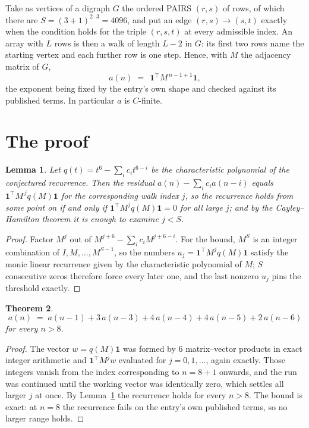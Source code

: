 \documentclass[11pt,a4paper]{article}
\theoremstyle{plain}
\newtheorem{theorem}{Theorem}
\newtheorem{lemma}[theorem]{Lemma}
\theoremstyle{definition}
\begin{document}
Take as vertices of a digraph $G$ the ordered PAIRS $(r,s)$ of rows, of which there are
$S=(3+1)^{2\cdot3}=4096$, and put an edge $(r,s)\to(s,t)$ exactly when the condition
holds for the triple $(r,s,t)$ at every admissible index. An array with $L$ rows is then a
walk of length $L-2$ in $G$: its first two rows name the starting vertex and each further
row is one step. Hence, with $M$ the adjacency matrix of $G$,
\[
a(n)\;=\;\,\mathbf{1}^{\!\top}M^{\,n-1+1}\mathbf{1},
\]
the exponent being fixed by the entry's own shape and checked against its published terms.
In particular $a$ is $C$-finite.

\section{The proof}

\begin{lemma}\label{lem:crit}
Let $q(t)=t^{6}-\sum_i c_it^{6-i}$ be the characteristic polynomial of the
conjectured recurrence. Then the residual $a(n)-\sum_ic_ia(n-i)$ equals
$\mathbf{1}^{\!\top}M^{\,j}q(M)\mathbf{1}$ for the corresponding walk index
$j$, so the recurrence holds from some point on if and only if
$\mathbf{1}^{\!\top}M^{j}q(M)\mathbf{1}=0$ for all large $j$; and by the
Cayley--Hamilton theorem it is enough to examine $j<S$.
\end{lemma}

\begin{proof}
Factor $M^{j}$ out of $M^{j+6}-\sum_ic_iM^{j+6-i}$. For the bound, $M^{S}$
is an integer combination of $I,M,\dots,M^{S-1}$, so the numbers
$u_j=\mathbf{1}^{\!\top}M^{j}q(M)\mathbf{1}$ satisfy the monic linear recurrence given by
the characteristic polynomial of $M$; $S$ consecutive zeros therefore force every later one,
and the last nonzero $u_j$ pins the threshold exactly.
\end{proof}

\begin{theorem}
\[
a(n)\;=\;a(n-1) + 3\,a(n-3) + 4\,a(n-4) + 4\,a(n-5) + 2\,a(n-6)
\]
for every $n>8$.
\end{theorem}

\begin{proof}
The vector $w=q(M)\mathbf{1}$ was formed by $6$ matrix--vector products in exact
integer arithmetic and $\mathbf{1}^{\!\top}M^{j}w$ evaluated for $j=0,1,\dots$, again
exactly. Those integers vanish from the index corresponding to $n=8+1$ onwards, and the
run was continued until the working vector was identically zero, which settles all larger $j$
at once. By Lemma~\ref{lem:crit} the recurrence holds for every $n>8$. The bound is exact: at $n=8$ the recurrence fails on the entry's own published terms, so no larger range holds.
\end{proof}
\end{document}

